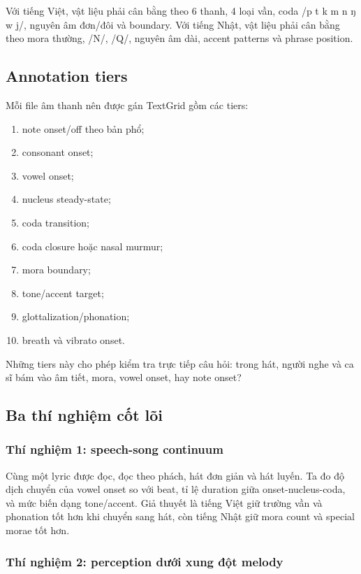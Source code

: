 \documentclass[12pt,a4paper]{article}
\begin{document}
Với tiếng Việt, vật liệu phải cân bằng theo 6 thanh, 4 loại vần, coda /p t k m n ŋ w j/, nguyên âm đơn/đôi và boundary. Với tiếng Nhật, vật liệu phải cân bằng theo mora thường, /N/, /Q/, nguyên âm dài, accent patterns và phrase position.

\subsection{Annotation tiers}

Mỗi file âm thanh nên được gán TextGrid gồm các tiers:

\begin{enumerate}
  \item note onset/off theo bản phổ;
  \item consonant onset;
  \item vowel onset;
  \item nucleus steady-state;
  \item coda transition;
  \item coda closure hoặc nasal murmur;
  \item mora boundary;
  \item tone/accent target;
  \item glottalization/phonation;
  \item breath và vibrato onset.
\end{enumerate}

Những tiers này cho phép kiểm tra trực tiếp câu hỏi: trong hát, người nghe và ca sĩ bám vào âm tiết, mora, vowel onset, hay note onset?

\subsection{Ba thí nghiệm cốt lõi}

\subsubsection{Thí nghiệm 1: speech-song continuum}

Cùng một lyric được đọc, đọc theo phách, hát đơn giản và hát luyến. Ta đo độ dịch chuyển của vowel onset so với beat, tỉ lệ duration giữa onset-nucleus-coda, và mức biến dạng tone/accent. Giả thuyết là tiếng Việt giữ trường vần và phonation tốt hơn khi chuyển sang hát, còn tiếng Nhật giữ mora count và special morae tốt hơn.

\subsubsection{Thí nghiệm 2: perception dưới xung đột melody}
\end{document}
